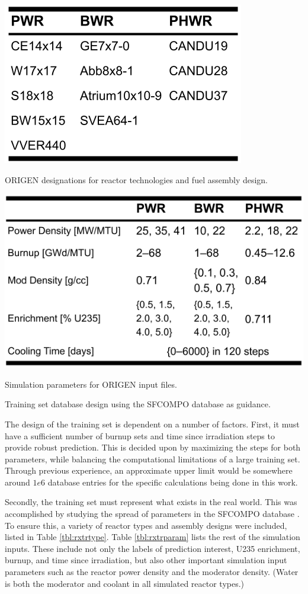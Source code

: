 \begin{table}[!h]
  \centering
  \begin{subtable}{\linewidth}
    \centering
    \includegraphics[width=0.5\linewidth]{./chapters/method/trainset4_Orxtrs.png}
    \caption{\gls{ORIGEN} designations for reactor technologies and fuel assembly design.}
    \label{tbl:rxtrtype}
    \vspace*{5mm}
  \end{subtable}
  \begin{subtable}{\linewidth}
    \centering
    \includegraphics[width=0.75\linewidth]{./chapters/method/trainset4_inputs.png}
    \caption{Simulation parameters for \gls{ORIGEN} input files.}
    \label{tbl:rxtrparam}
  \end{subtable}%
  \caption{Training set database design using the \gls{SFCOMPO} database as guidance. \cite{sfcompo}}
  \label{tbl:train}
\end{table}

The design of the training set is dependent on a number of factors.  First, it
must have a sufficient number of burnup sets and time since irradiation steps
to provide robust prediction. This is decided upon by maximizing the steps for
both parameters, while balancing the computational limitations of a large
training set. Through previous experience, an approximate upper limit would be
somewhere around $1e6$ database entries for the specific calculations being
done in this work.

Secondly, the training set must represent what exists in the real world. This
was accomplished by studying the spread of parameters in the \gls{SFCOMPO}
database \cite{sfcompo}.  To ensure this, a variety of reactor types and
assembly designs were included, listed in Table \ref{tbl:rxtrtype}. Table
\ref{tbl:rxtrparam} lists the rest of the simulation inputs. These include not
only the labels of prediction interest, \gls{U235} enrichment, burnup, and time
since irradiation, but also other important simulation input parameters such as
the reactor power density and the moderator density.  (Water is both the
moderator and coolant in all simulated reactor types.)

